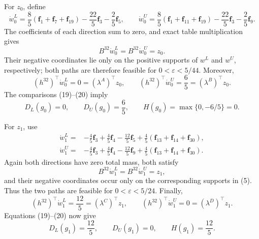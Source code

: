 For \(z_0\), define
\[
\dot w^L_0=\frac85(\mathbf f_1+\mathbf f_7+\mathbf f_{19})
-\frac{22}{5}\mathbf f_3-\frac25\mathbf f_5,
\qquad
\dot w^U_0=\frac85(\mathbf f_1+\mathbf f_{11}+\mathbf f_{19})
-\frac{22}{5}\mathbf f_3-\frac25\mathbf f_9.
\tag{21}
\]
The coefficients of each direction sum to zero, and exact table multiplication gives
\[
B^{32}\dot w^L_0=B^{32}\dot w^U_0=z_0.
\tag{22}
\]
Their negative coordinates lie only on the positive supports of \(w^L\) and \(w^U\), respectively; both paths are therefore feasible for \(0<\varepsilon<5/44\).  Moreover,
\[
(h^{32})^\top\dot w^L_0=0=(\lambda^A)^\top z_0,
\qquad
(h^{32})^\top\dot w^U_0=\frac65=(\lambda^B)^\top z_0.
\tag{23}
\]
The comparisons (19)--(20) imply
\[
D_L(g_0)=0,
\qquad
D_U(g_0)=\frac65,
\qquad
H(g_0)=\max\{0,-6/5\}=0.
\tag{24}
\]

For \(z_1\), use
\[
\begin{split}
\dot w^L_1={}&-\frac45\mathbf f_3+\frac45\mathbf f_4-\frac{12}{5}\mathbf f_5
+\frac45(\mathbf f_{13}+\mathbf f_{14}+\mathbf f_{30}),\\
\dot w^U_1={}&-\frac45\mathbf f_3+\frac45\mathbf f_4-\frac{12}{5}\mathbf f_9
+\frac45(\mathbf f_{13}+\mathbf f_{14}+\mathbf f_{30}).
\end{split}
\tag{25}
\]
Again both directions have zero total mass, both satisfy
\[
B^{32}\dot w^L_1=B^{32}\dot w^U_1=z_1,
\tag{26}
\]
and their negative coordinates occur only on the corresponding supports in (5).  Thus the two paths are feasible for \(0<\varepsilon<5/24\).  Finally,
\[
(h^{32})^\top\dot w^L_1=\frac{12}{5}=(\lambda^C)^\top z_1,
\qquad
(h^{32})^\top\dot w^U_1=0=(\lambda^D)^\top z_1.
\tag{27}
\]
Equations (19)--(20) now give
\[
D_L(g_1)=\frac{12}{5},
\qquad
D_U(g_1)=0,
\qquad
H(g_1)=\frac{12}{5}.
\tag{28}
\]


